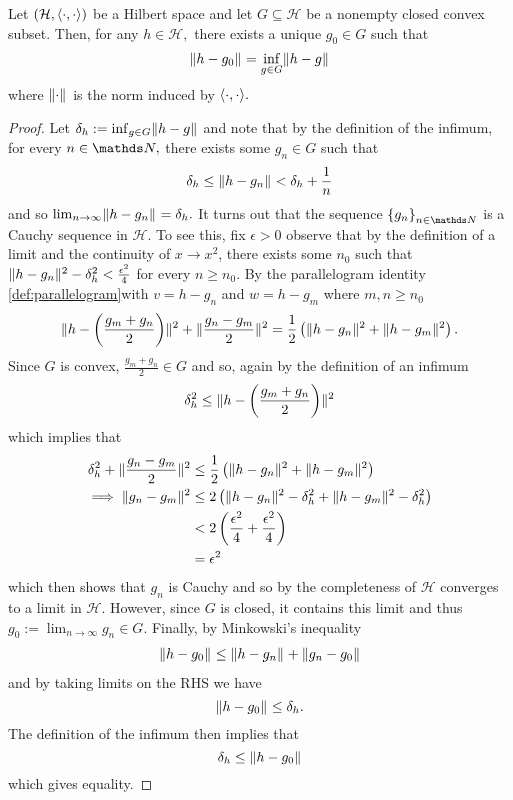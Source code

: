 \begin{thm}[Projection]
\label{thm:projectionThm}Let $\left(\mathcal{H},\langle\cdot,\cdot\rangle\right)$
be a Hilbert space and let $G\subseteq\mathcal{H}$ be a nonempty
closed convex subset. Then, for any $h\in\mathcal{H},$ there exists
a unique $g_{0}\in G$ such that 
\[
\lVert h-g_{0}\rVert_{}=\inf_{g\in G}\lVert h-g\rVert_{}
\]
where $\lVert\cdot\rVert_{}$ is the norm induced by $\langle\cdot,\cdot\rangle.$
\end{thm}

\begin{proof}
Let $\delta_{h}:=\inf_{g\in G}\lVert h-g\rVert_{}$ and note that by the
definition of the infimum, for every $n\in\N,$ there exists some
$g_{n}\in G$ such that 
\[
\delta_{h}\leq\lVert h-g_{n}\rVert_{}<\delta_{h}+\frac{1}{n}
\]
and so $\lim_{n\to\infty}\lVert h-g_{n}\rVert_{}=\delta_{h}.$ It turns
out that the sequence $\left\{ g_{n}\right\} _{n\in\N}$ is a Cauchy
sequence in $\mathcal{H}.$ To see this, fix $\epsilon>0$ observe
that by the definition of a limit and the continuity of $x\to x^{2}$,
there exists some $n_{0}$ such that $\lVert h-g_{n}\rVert_{}^{2}-\delta_{h}^{2}<\frac{\epsilon^{2}}{4}$
for every $n\geq n_{0}.$ By the parallelogram identity \ref{def:parallelogram}with
$v=h-g_{n}$ and $w=h-g_{m}$ where $m,n\geq n_{0}$
\[
\lVert h-\left(\frac{g_{m}+g_{n}}{2}\right)\rVert_{}^{2}+\lVert\frac{g_{n}-g_{m}}{2}\rVert_{}^{2}=\frac{1}{2}\left(\lVert h-g_{n}\rVert_{}^{2}+\lVert h-g_{m}\rVert_{}^{2}\right).
\]
Since $G$ is convex, $\frac{g_{m}+g_{n}}{2}\in G$ and so, again
by the definition of an infimum
\[
\delta_{h}^{2}\leq\lVert h-\left(\frac{g_{m}+g_{n}}{2}\right)\rVert_{}^{2}
\]
which implies that
\begin{align*}
\delta_{h}^{2}+\lVert\frac{g_{n}-g_{m}}{2}\rVert_{}^{2} & \leq\frac{1}{2}\left(\lVert h-g_{n}\rVert_{}^{2}+\lVert h-g_{m}\rVert_{}^{2}\right)\\
\implies\lVert g_{n}-g_{m}\rVert_{}^{2} & \leq2\left(\lVert h-g_{n}\rVert_{}^{2}-\delta_{h}^{2}+\lVert h-g_{m}\rVert_{}^{2}-\delta_{h}^{2}\right)\\
 & <2\left(\frac{\epsilon^{2}}{4}+\frac{\epsilon^{2}}{4}\right)\\
 & =\epsilon^{2}
\end{align*}
which then shows that $g_{n}$ is Cauchy and so by the completeness
of $\mathcal{H}$ converges to a limit in $\mathcal{H}$. However,
since $G$ is closed, it contains this limit and thus $g_{0}:=\lim_{n\to\infty}g_{n}\in G.$
Finally, by Minkowski's inequality
\begin{align*}
\lVert h-g_{0}\rVert_{} & \leq\lVert h-g_{n}\rVert_{}+\lVert g_{n}-g_{0}\rVert_{}\\
\end{align*}
and by taking limits on the RHS we have
\[
\lVert h-g_{0}\rVert_{}\leq\delta_{h}.
\]
The definition of the infimum then implies that 
\[
\delta_{h}\leq\lVert h-g_{0}\rVert_{}
\]
which gives equality.


\end{proof}
